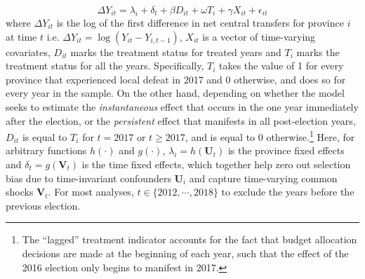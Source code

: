 \documentclass[12pt]{article}\usepackage[]{graphicx}\usepackage[]{color}
\newcommand{\1}{\mathbbm{1}}
\begin{document}
\begin{equation}
\Delta Y_{it} = \lambda_i + \delta_t + \beta D_{it} + \omega T_{i} + \gamma X_{it} + \epsilon_{it} \tag{FE}\label{eq:FE}
\end{equation}
where $\Delta Y_{it}$ is the log of the first difference in net central transfers for province $i$ at time $t$ i.e. $\Delta Y_{it} = \log(Y_{it} - Y_{i, t-1})$, $X_{it}$ is a vector of time-varying covariates, $D_{it}$ marks the treatment status for treated years and $T_{i}$ marks the treatment status for all the years. Specifically, $T_{i}$ takes the value of 1 for every province that experienced local defeat in 2017 and 0 otherwise, and does so for every year in the sample. On the other hand, depending on whether the model seeks to estimate the \textit{instantaneous} effect that occurs in the one year immediately after the election, or the \textit{persistent} effect that manifests in all post-election years, $D_{it}$ is equal to $T_{i}$ for $t=2017$ or $t\geq2017$, and is equal to $0$ otherwise.\footnote{The ``lagged'' treatment indicator accounts for the fact that budget allocation decisions are made at the beginning of each year, such that the effect of the 2016 election only begins to manifest in 2017.} Here, for arbitrary functions $h(\cdot)$ and $g(\cdot)$, $\lambda_i = h(\mathbf{U}_t)$ is the province fixed effects and $\delta_t = g(\mathbf{V}_t)$ is the time fixed effects, which together help zero out selection bias due to time-invariant confounders $\mathbf{U}_i$ and capture time-varying common shocks $\mathbf{V}_t$. For most analyses, $t \in \{2012, \cdots, 2018\}$ to exclude the years before the previous election.
\end{document}
